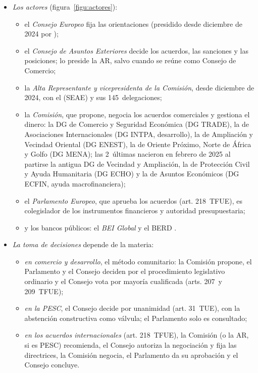 \documentclass[11pt]{article}
\begin{document}
\begin{itemize}
\item \emph{Los actores} (figura~\ref{figu:actores}):
  \begin{itemize}
  \item el \emph{Consejo Europeo} fija las orientaciones (presidido desde diciembre de 2024 por )\nocite{CE2026Organigrama};
  \item el \emph{Consejo de Asuntos Exteriores} decide los acuerdos, las sanciones y las posiciones; lo preside la AR, salvo cuando se reúne como Consejo de Comercio;
  \item la \emph{Alta Representante y vicepresidenta de la Comisión},  desde diciembre de 2024, con el  (SEAE) y sus 145~delegaciones\nocite{SEAE2026};
  \item la \emph{Comisión}, que propone, negocia los acuerdos comerciales y gestiona el dinero\nocite{CE2026Organigrama}: la DG de Comercio y Seguridad Económica (DG TRADE), la de Asociaciones Internacionales (DG INTPA, desarrollo), la de Ampliación y Vecindad Oriental (DG ENEST), la de Oriente Próximo, Norte de África y Golfo (DG MENA); las 2~últimas nacieron en febrero de 2025 al partirse la antigua DG de Vecindad y Ampliación, la de Protección Civil y Ayuda Humanitaria (DG ECHO) y la de Asuntos Económicos (DG ECFIN, ayuda macrofinanciera);
  \item el \emph{Parlamento Europeo}, que aprueba los acuerdos (art. 218~TFUE), es colegislador de los instrumentos financieros y autoridad presupuestaria;
  \item y los bancos públicos: el \emph{BEI Global} y el BERD .
  \end{itemize}
\item \emph{La toma de decisiones} depende de la materia:
  \begin{itemize}
  \item \emph{en comercio y desarrollo}, el método comunitario: la Comisión propone, el Parlamento y el Consejo deciden por el procedimiento legislativo ordinario y el Consejo vota por mayoría cualificada (arts. 207~y 209~TFUE);
  \item \emph{en la PESC}, el Consejo decide por unanimidad (art. 31~TUE), con la abstención constructiva como válvula; el Parlamento solo es consultado;
  \item \emph{en los acuerdos internacionales} (art. 218~TFUE), la Comisión (o la AR, si es PESC) recomienda, el Consejo autoriza la negociación y fija las directrices, la Comisión negocia, el Parlamento da su aprobación y el Consejo concluye.
  \end{itemize}
\end{itemize}
\end{document}
